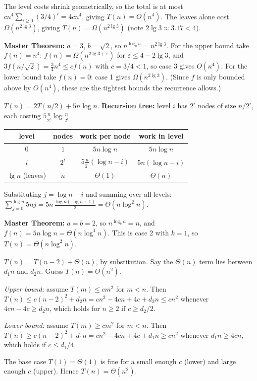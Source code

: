 \documentclass[12pt,twoside]{article}
\begin{document}
\begin{problems}
\begin{problemparts}
The level costs shrink geometrically, so the total is at most
$cn^4\sum_{i\ge 0}(3/4)^i = 4cn^4$, giving $T(n)=O(n^4)$. The leaves alone cost
$\Omega(n^{2\lg 3})$, giving $T(n)=\Omega(n^{2\lg 3})$ (note $2\lg 3\approx 3.17 < 4$).

\textbf{Master Theorem:} $a=3$, $b=\sqrt2$, so $n^{\log_b a}=n^{2\lg 3}$. For the upper bound
take $f(n)=n^4$: $f(n)=\Omega(n^{2\lg 3+\varepsilon})$ for $\varepsilon \le 4-2\lg 3$, and
$3f(n/\sqrt2) = \tfrac34 n^4 \le c f(n)$ with $c = 3/4 < 1$, so case 3 gives $O(n^4)$.
For the lower bound take $f(n)=0$: case 1 gives $\Omega(n^{2\lg 3})$.
(Since $f$ is only bounded above by $O(n^4)$, these are the tightest bounds the recurrence allows.)

\problempart %
$T(n) = 2T(n/2) + 5n\log n$. \textbf{Recursion tree:} level $i$ has $2^i$ nodes of size $n/2^i$,
each costing $5\frac{n}{2^i}\log\frac{n}{2^i}$.

\begin{center}
\begin{tabular}{c|c|c|c}
level & nodes & work per node & work in level \\ \hline
$0$ & $1$ & $5n\log n$ & $5n\log n$ \\
$i$ & $2^i$ & $5\frac{n}{2^i}(\log n - i)$ & $5n(\log n - i)$ \\
$\lg n$ (leaves) & $n$ & $\Theta(1)$ & $\Theta(n)$
\end{tabular}
\end{center}

Substituting $j=\log n - i$ and summing over all levels:
$\sum_{j=0}^{\log n} 5nj = 5n\,\frac{\log n(\log n+1)}{2} = \Theta(n\log^2 n)$.

\textbf{Master Theorem:} $a=b=2$, so $n^{\log_b a}=n$, and $f(n)=5n\log n=\Theta(n\log^1 n)$.
This is case 2 with $k=1$, so $T(n)=\Theta(n\log^2 n)$.

\problempart %
$T(n) = T(n-2)+\Theta(n)$, by substitution. Say the $\Theta(n)$ term lies between $d_1 n$ and
$d_2 n$. Guess $T(n)=\Theta(n^2)$.

\emph{Upper bound:} assume $T(m)\le cm^2$ for $m<n$. Then
$T(n)\le c(n-2)^2 + d_2 n = cn^2 - 4cn + 4c + d_2 n \le cn^2$
whenever $4cn - 4c \ge d_2 n$, which holds for $n\ge 2$ if $c \ge d_2/2$.

\emph{Lower bound:} assume $T(m)\ge cm^2$ for $m<n$. Then
$T(n)\ge c(n-2)^2 + d_1 n = cn^2 - 4cn + 4c + d_1 n \ge cn^2$
whenever $d_1 n \ge 4cn$, which holds if $c \le d_1/4$.

The base case $T(1)=\Theta(1)$ is fine for a small enough $c$ (lower) and large enough $c$ (upper).
Hence $T(n)=\Theta(n^2)$.
\end{problemparts}


\end{problems}
\end{document}
